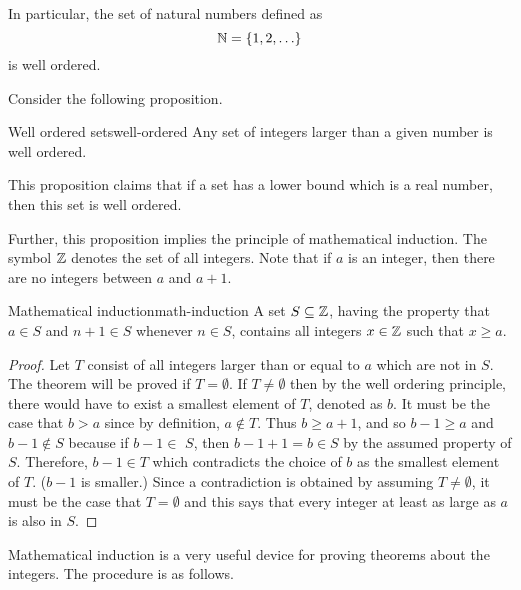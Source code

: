 In particular, the set of natural numbers defined as
\begin{equation*}
\mathbb{N} = \left\{1,2,\ldots\right\}
\end{equation*}
is well ordered.

Consider the following proposition.

\begin{proposition}{Well ordered sets}{well-ordered}
Any set of integers larger than a given number is well ordered.
\end{proposition}

This proposition claims that if a set has a lower bound which is a real number, 
then this set is well ordered.

Further, this proposition implies the principle of mathematical induction. The symbol $\mathbb{Z}$ denotes the set of all
integers. Note that if $a$ is an integer, then there are no integers between
$a$ and $a+1$.

\begin{theorem}{Mathematical induction}{math-induction}
 A set $S\subseteq \mathbb{Z}$, having
the property that $a\in S$ and $n+1\in S$ whenever $n\in S$, contains all
integers $x\in \mathbb{Z}$ such that $x\geq a$.
\end{theorem}

\begin{proof} 
Let $T$ consist of all integers larger than or equal to $a$
which are not in $S$. The theorem will be proved if $T=\emptyset$. If 
$T\neq \emptyset $ then by the well ordering principle, there would have to
exist a smallest element of $T$, denoted as $b$. It must be the case that 
$b>a$ since by definition, $a\notin T$. Thus $b\geq a+1$, and so $b-1\geq a$
and $b-1\notin S$ because if $b-1\in $ $S$, then $b-1+1=b\in S$ by the
assumed property of $S$. Therefore, $b-1\in T$ which contradicts the choice
of $b$ as the smallest element of $T$. ($b-1$ is smaller.) Since a
contradiction is obtained by assuming $T\neq \emptyset$, it must be the
case that $T=\emptyset $ and this says that every integer at least as large
as $a$ is also in $S$.
\end{proof}

Mathematical induction is a very useful device for proving theorems about
the integers. The procedure is as follows.

